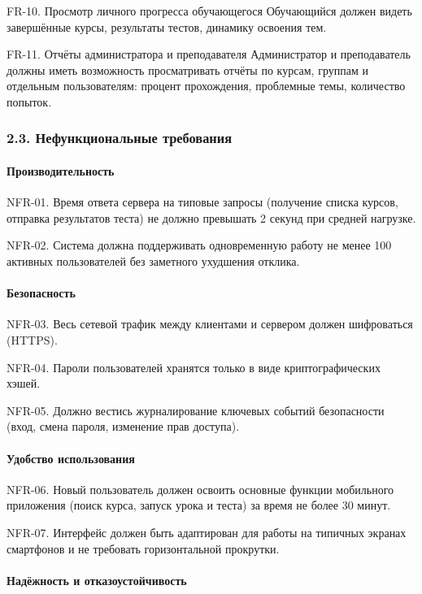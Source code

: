 \documentclass{G7-32}
\begin{document}
FR-10. Просмотр личного прогресса обучающегося  
Обучающийся должен видеть завершённые курсы, результаты тестов, динамику освоения тем.

FR-11. Отчёты администратора и преподавателя  
Администратор и преподаватель должны иметь возможность просматривать отчёты по курсам, группам и отдельным пользователям: процент прохождения, проблемные темы, количество попыток.

\subsubsection*{2.3. Нефункциональные требования}

\paragraph{Производительность}

NFR-01. Время ответа сервера на типовые запросы (получение списка курсов, отправка результатов теста) не должно превышать 2 секунд при средней нагрузке.  

NFR-02. Система должна поддерживать одновременную работу не менее 100 активных пользователей без заметного ухудшения отклика.

\paragraph{Безопасность}

NFR-03. Весь сетевой трафик между клиентами и сервером должен шифроваться (HTTPS).  

NFR-04. Пароли пользователей хранятся только в виде криптографических хэшей.  

NFR-05. Должно вестись журналирование ключевых событий безопасности (вход, смена пароля, изменение прав доступа).

\paragraph{Удобство использования}

NFR-06. Новый пользователь должен освоить основные функции мобильного приложения (поиск курса, запуск урока и теста) за время не более 30 минут.  

NFR-07. Интерфейс должен быть адаптирован для работы на типичных экранах смартфонов и не требовать горизонтальной прокрутки.

\paragraph{Надёжность и отказоустойчивость}
\end{document}
